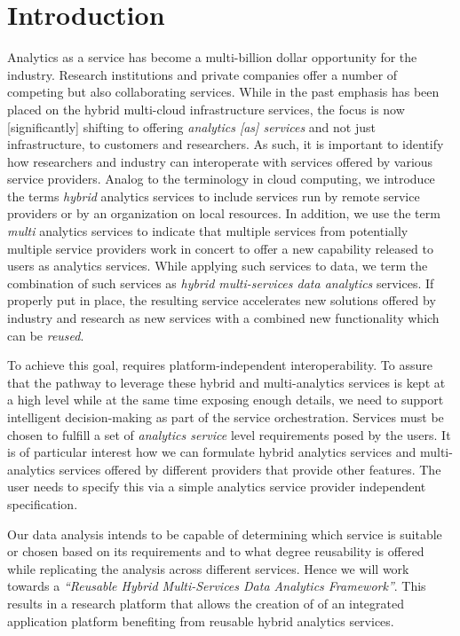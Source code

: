 
\section{Introduction}
\label{sec:summary}


Analytics as a service has become a multi-billion dollar opportunity
for the industry. Research institutions and private companies offer a number
of competing but also collaborating services. While in the past
emphasis has been placed on the hybrid multi-cloud infrastructure
services, the focus is now [significantly] shifting to offering {\em
analytics [as] services} and not just infrastructure, to customers and
researchers. As such, it is important to identify how researchers and
industry can interoperate with services offered by various service
providers. Analog to the terminology in cloud computing, we introduce
the terms {\em hybrid} analytics services to include services run by
remote service providers or by an organization on local resources. 
In
addition, we use the term {\em multi} analytics services to indicate
that multiple services from potentially multiple service providers
work in concert to offer a new capability released to users as
analytics services. While applying such services to data, we term the
combination of such services as {\em hybrid multi-services data
analytics} services. If properly put in place, the resulting service
accelerates new solutions offered by industry and research as new
services with a combined new functionality which can be {\em reused}.

To achieve this goal, requires platform-independent
interoperability.  To assure that the pathway to leverage these hybrid
and multi-analytics services is kept at a high level while at the same
time exposing enough details, we need to support intelligent
decision-making as part of the service orchestration. Services must be
chosen to fulfill a set of {\em analytics service} level requirements
posed by the users. It is of particular interest how we can formulate
hybrid analytics services and multi-analytics services offered by
different providers that provide other features. The user needs to
specify this via a simple analytics service provider independent
specification.

Our data analysis intends to be capable of determining which service is
suitable or chosen based on its requirements and to what degree
reusability is offered while replicating the analysis across different
services. Hence we will work towards a {\em ``Reusable Hybrid
Multi-Services Data Analytics Framework''}. This results in a research
platform that allows the creation of of an integrated application
platform benefiting from reusable hybrid analytics services.


